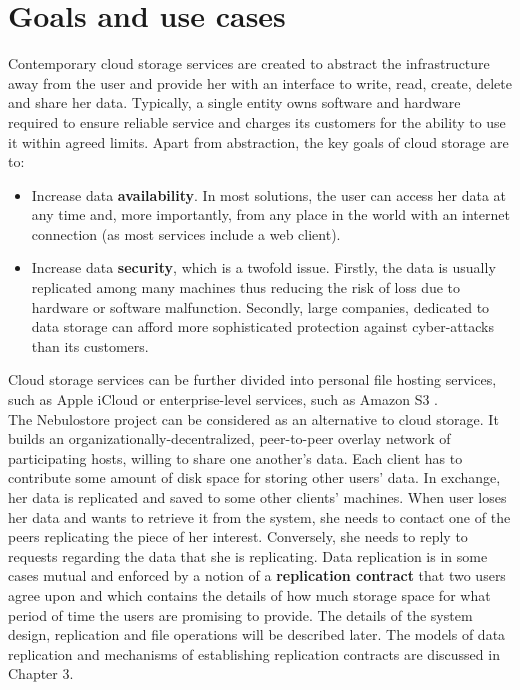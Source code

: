 \documentclass{pracamgren}
\begin{document}
\section{Goals and use cases}

Contemporary cloud storage services are created to abstract the infrastructure away from the user and provide her with an interface to write, read, create, delete and share her data. Typically, a single entity owns software and hardware required to ensure reliable service and charges its customers for the ability to use it within agreed limits. Apart from abstraction, the key goals of cloud storage are to:
\begin{itemize}
\item Increase data {\bf availability}. In most solutions, the user can access her data at any time and, more importantly, from any place in the world with an internet connection (as most services include a web client).
\item Increase data {\bf security}, which is a twofold issue. Firstly, the data is usually replicated among many machines thus reducing the risk of loss due to hardware or software malfunction. Secondly, large companies, dedicated to data storage can afford more sophisticated protection against cyber-attacks than its customers.
\end{itemize}
Cloud storage services can be further divided into personal file hosting services, such as Apple iCloud \cite{icloud} or enterprise-level services, such as Amazon S3 \cite{amazon}.\\

The Nebulostore project can be considered as an alternative to cloud storage. It builds an organizationally-decentralized, peer-to-peer overlay network of participating hosts, willing to share one another's data. Each client has to contribute some amount of disk space for storing other users' data. In exchange, her data is replicated and saved to some other clients' machines. When user loses her data and wants to retrieve it from the system, she needs to contact one of the peers replicating the piece of her interest. Conversely, she needs to reply to requests regarding the data that she is replicating. Data replication is in some cases mutual and enforced by a notion of a {\bf replication contract} that two users agree upon and which contains the details of how much storage space for what period of time the users are promising to provide. The details of the system design, replication and file operations will be described later. The models of data replication and mechanisms of establishing replication contracts are discussed in Chapter 3.\\
\end{document}

